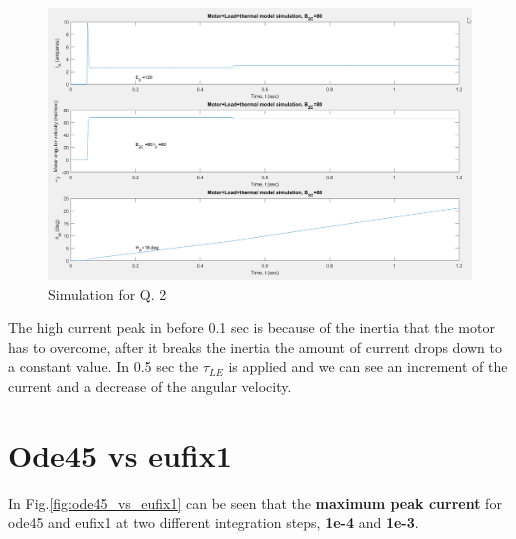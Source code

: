 \documentclass[]{article}
\begin{document}
\begin{figure}
	\centering
	\includegraphics[width=1\linewidth]{point2}
	\caption{Simulation for Q. 2}
	\label{fig:point2}
\end{figure}

The high current peak in before 0.1 sec is because of the inertia that the motor has to overcome, after it breaks the inertia the amount of current drops down to a constant value. In 0.5 sec the $\tau_{LE}$ is applied and we can see an increment of the current and a decrease of the angular velocity.

\section{Ode45 vs eufix1}
In Fig.\ref{fig:ode45_vs_eufix1} can be seen that the \textbf{maximum peak current} for ode45 and eufix1 at two different integration steps, \textbf{1e-4} and \textbf{1e-3}.
\end{document}
